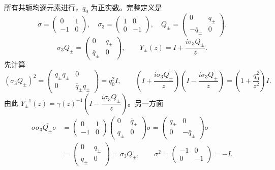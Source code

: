 \documentclass[lang=cn,scheme=chinese,mode=simple,device=normal,color=blue,
math=cm,thmcnt=section,12pt]{elegantbook}
\begin{document}
\begin{callout}[计算：(6.4.43) 中三个恒等式的逐项验证]
    所有共轭均逐元素进行，$q_0$ 为正实数。完整定义是
    \[
        \sigma=\begin{pmatrix}0&1\\-1&0\end{pmatrix},\quad
        \sigma_3=\begin{pmatrix}1&0\\0&-1\end{pmatrix},\quad
        Q_\pm=\begin{pmatrix}0&q_\pm\\-\bar q_\pm&0\end{pmatrix}.
    \]
    \[
        \sigma_3Q_\pm=\begin{pmatrix}0&q_\pm\\\bar q_\pm&0\end{pmatrix},\qquad
        Y_\pm(z)=I+\dfrac{i\sigma_3Q_\pm}{z}.
    \]
    先计算
    \[
        (\sigma_3Q_\pm)^2=\begin{pmatrix}q_\pm\bar q_\pm&0\\0&\bar q_\pm q_\pm\end{pmatrix}=q_0^2I,
        \qquad (I+\dfrac{i\sigma_3Q_\pm}{z})(I-\dfrac{i\sigma_3Q_\pm}{z})=\left(1+\dfrac{q_0^2}{z^2}\right)I.
    \]
    由此 $Y_\pm^{-1}(z)=\gamma(z)^{-1}(I-\dfrac{i\sigma_3Q_\pm}{z})$。另一方面
    \[
        \begin{aligned}
            \sigma\sigma_3\overline{Q_\pm}\sigma
             & =\begin{pmatrix}0&1\\-1&0\end{pmatrix}\begin{pmatrix}0&\bar q_\pm\\q_\pm&0\end{pmatrix}\sigma
            =\begin{pmatrix}q_\pm&0\\0&-\bar q_\pm\end{pmatrix}\sigma                                        \\
             & =\begin{pmatrix}0&q_\pm\\\bar q_\pm&0\end{pmatrix}=\sigma_3Q_\pm,
            \qquad \sigma^2=\begin{pmatrix}-1&0\\0&-1\end{pmatrix}=-I.
        \end{aligned}
    \]

\end{callout}
\end{document}

